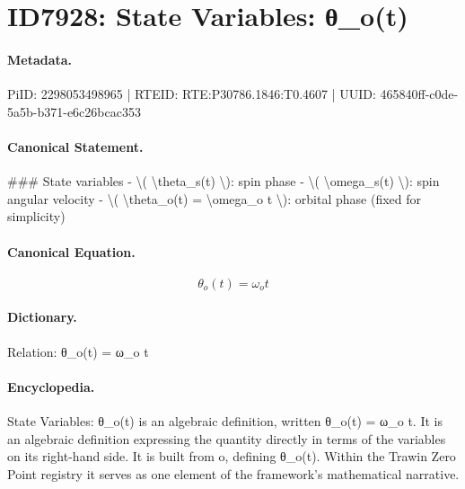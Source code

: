 \section*{ID7928: State Variables: θ\_o(t)}
\paragraph{Metadata.}
PiID: 2298053498965 | RTEID: RTE:P30786.1846:T0.4607 | UUID: 465840ff-c0de-5a5b-b371-e6c26bcac353

\paragraph{Canonical Statement.}
\#\#\# State variables - \textbackslash{}( \textbackslash{}theta\_s(t) \textbackslash{}): spin phase - \textbackslash{}( \textbackslash{}omega\_s(t) \textbackslash{}): spin angular velocity - \textbackslash{}( \textbackslash{}theta\_o(t) = \textbackslash{}omega\_o t \textbackslash{}): orbital phase (fixed for simplicity)

\paragraph{Canonical Equation.}
\[
\theta_o(t) = \omega_o t
\]

\paragraph{Dictionary.}
Relation: θ\_o(t) = ω\_o t

\paragraph{Encyclopedia.}
State Variables: θ\_o(t) is an algebraic definition, written θ\_o(t) = ω\_o t. It is an algebraic definition expressing the quantity directly in terms of the variables on its right-hand side. It is built from o, defining θ\_o(t). Within the Trawin Zero Point registry it serves as one element of the framework's mathematical narrative.

